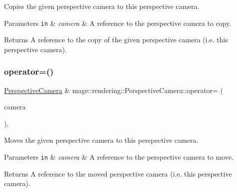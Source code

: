 Copies the given perspective camera to this perspective camera.


\begin{DoxyParams}[1]{Parameters}
\mbox{\tt in}  & {\em camera} & A reference to the perspective camera to copy. \\
\hline
\end{DoxyParams}
\begin{DoxyReturn}{Returns}
A reference to the copy of the given perspective camera (i.\+e. this perspective camera). 
\end{DoxyReturn}
\mbox{\label{classmage_1_1rendering_1_1_perspective_camera_ac5b98cb14cd16dffd1a46c4e52ef72a8}} 
\subsubsection{\texorpdfstring{operator=()}{operator=()}\hspace{0.1cm}{\footnotesize\ttfamily [2/2]}}
{\footnotesize\ttfamily \mbox{\hyperlink{classmage_1_1rendering_1_1_perspective_camera}{Perspective\+Camera}} \& mage\+::rendering\+::\+Perspective\+Camera\+::operator= (\begin{DoxyParamCaption}\item[{\mbox{\hyperlink{classmage_1_1rendering_1_1_perspective_camera}{Perspective\+Camera}} \&\&}]{camera }\end{DoxyParamCaption})\hspace{0.3cm}{\ttfamily [default]}, {\ttfamily [noexcept]}}

Moves the given perspective camera to this perspective camera.


\begin{DoxyParams}[1]{Parameters}
\mbox{\tt in}  & {\em camera} & A reference to the perspective camera to move. \\
\hline
\end{DoxyParams}
\begin{DoxyReturn}{Returns}
A reference to the moved perspective camera (i.\+e. this perspective camera). 
\end{DoxyReturn}
\mbox{\label{classmage_1_1rendering_1_1_perspective_camera_a180f74e8b39609aee8dcc2741a74076f}} 
